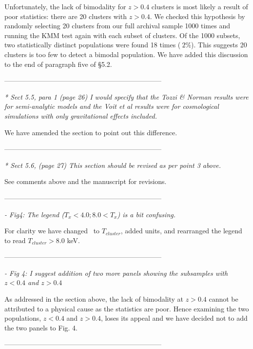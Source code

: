 \documentclass[11pt]{article}
\begin{document}
Unfortunately, the lack of bimodality for $z>0.4$ clusters is most
likely a result of poor statistics: there are 20 clusters with $z >
0.4$. We checked this hypothesis by randomly selecting 20 clusters
from our full archival sample 1000 times and running the KMM test
again with each subset of clusters. Of the 1000 subsets, two
statistically distinct populations were found 18 times ($~2\%$). This
suggests 20 clusters is too few to detect a bimodal population. We
have added this discussion to the end of paragraph five of \S 5.2.

---------------------------------------------------------------------

{\it{* Sect 5.5, para 1 (page 26) I would specify that the Tozzi \&
    Norman results were for semi-analytic models and the Voit et al
    results were for cosmological simulations with only gravitational
    effects included.}}

We have amended the section to point out this difference.

---------------------------------------------------------------------

{\it{* Sect 5.6, (page 27) This section should be revised as per point
    3 above.}}

See comments above and the manuscript for revisions.

---------------------------------------------------------------------

{\it{- Fig4: The legend ($T_x < 4.0; 8.0 < T_x$) is a bit confusing.}}

For clarity we have changed \Tx\ to $T_{cluster}$, added units, and
rearranged the legend to read $T_{cluster} > 8.0$ keV.

---------------------------------------------------------------------

{\it{- Fig 4: I suggest addition of two more panels showing the
    subsamples with $z<0.4$ and $z>0.4$}}

As addressed in the section above, the lack of bimodality at $z > 0.4$
cannot be attributed to a physical cause as the statistics are
poor. Hence examining the two populations, $z<0.4$ and $z>0.4$, loses
its appeal and we have decided not to add the two panels to Fig. 4.

---------------------------------------------------------------------
\end{document}
